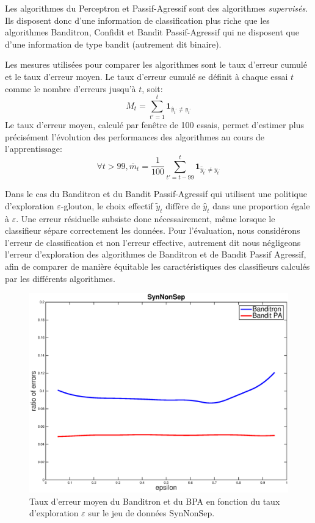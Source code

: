 \documentclass[twocolumn]{article}
\begin{document}
Les algorithmes du Perceptron et Passif-Agressif sont des algorithmes \emph{supervisés}. Ils disposent donc d'une information de classification plus riche que les algorithmes Banditron, Confidit et Bandit Passif-Agressif qui ne disposent que d'une information de type bandit (autrement dit binaire).

Les mesures utilisées pour comparer les algorithmes sont le taux d'erreur cumulé et le taux d'erreur moyen. Le taux d'erreur cumulé se définit à chaque essai $t$ comme le nombre d'erreurs jusqu'à $t$, soit:
$$M_t = \sum_{t'=1}^t \mathbf{1}_{\hat{y}_{t^\prime}\neq y_{t^\prime}} $$
Le taux d'erreur moyen, calculé par fenêtre de 100 essais, permet d'estimer plus précisément l'évolution des performances des algorithmes au cours de l'apprentissage:
$$\forall t>99, \bar{m}_t = \frac{1}{100} \sum_{t'=t - 99}^t \mathbf{1}_{\hat{y}_{t^\prime}\neq y_{t^\prime}}$$
  
Dans le cas du Banditron et du Bandit Passif-Agressif qui utilisent une politique d'exploration $\varepsilon$-glouton, le choix effectif $\tilde{y}_t$ diffère de $\hat{y}_t$ dans une proportion égale à $\varepsilon$. Une erreur résiduelle subsiste donc nécessairement, même lorsque le classifieur sépare correctement les données. Pour l'évaluation, nous considérons l'erreur de classification et non l'erreur effective, autrement dit nous négligeons l'erreur d'exploration des algorithmes de Banditron et de Bandit Passif Agressif, afin de comparer de manière équitable les caractéristiques des classifieurs calculés par les différents algorithmes.

\begin{figure}[ht!]
	\centerline{
		\includegraphics[width=\linewidth]{figs/SynNonSep_gamma.eps}}
	\caption{Taux d'erreur moyen du Banditron et du BPA en fonction du taux d'exploration $\varepsilon$ sur le jeu de données SynNonSep. }
	\label{pic:BPASNSerr}
\end{figure}
\end{document}
